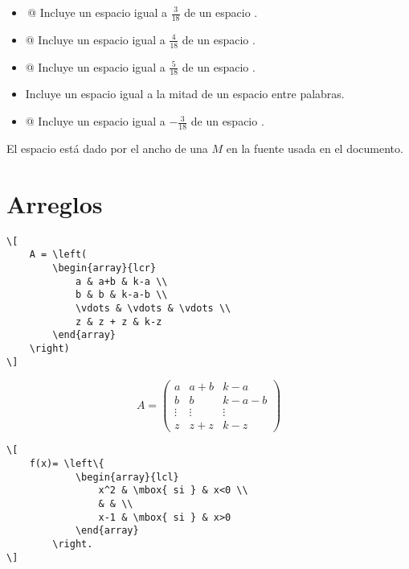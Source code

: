 \documentclass[a4,10pt]{aleph-notas}
\theoremstyle{definition}
\theoremstyle{plain}
\begin{document}
\begin{itemize}
    \item \verb@\,@ Incluye un espacio igual a $\frac{3}{18}$ de un espacio \verb@\quad@. 
    \item \verb@\:@ Incluye un espacio igual a $\frac{4}{18}$ de un espacio \verb@\quad@. 
    \item \verb@\;@ Incluye un espacio igual a $\frac{5}{18}$ de un espacio \verb@\quad@.
    \item \verb@\@ Incluye un espacio igual a la mitad de un espacio entre palabras.
    \item \verb@\!@ Incluye un espacio igual a $-\frac{3}{18}$ de un espacio \verb@\quad@. 
\end{itemize}

\begin{obs}
El espacio \verb@\quad@ está dado por el ancho de una $M$ en la fuente usada en el documento.
\end{obs}

\section{Arreglos}

\begin{lstlisting}[frame=single]
\[
    A = \left( 
        \begin{array}{lcr}
            a & a+b & k-a \\
            b & b & k-a-b \\
            \vdots & \vdots & \vdots \\
            z & z + z & k-z
        \end{array}
    \right)
\]
\end{lstlisting}

\[
    A = \left( \begin{array}{lcr}
    a & a+b & k-a \\
    b & b & k-a-b \\
    \vdots & \vdots & \vdots \\
    z & z + z & k-z
    \end{array}
    \right)
\]

\begin{lstlisting}[frame=single]
\[
    f(x)= \left\{ 
            \begin{array}{lcl}
                x^2 & \mbox{ si } & x<0 \\
                & & \\
                x-1 & \mbox{ si } & x>0
            \end{array}
        \right.
\]
\end{lstlisting}
\end{document}
